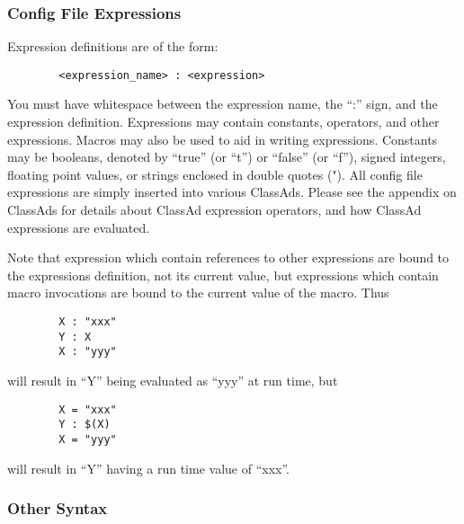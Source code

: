 \subsubsection{Config File Expressions}
\label{sec:Config-File-Expressions}

Expression definitions are of the form:

\begin{verbatim}
        <expression_name> : <expression>
\end{verbatim}

\Note You must have whitespace between the expression name,
the ``:'' sign, and the expression definition.  Expressions may
contain constants, operators, and other expressions.  Macros may also
be used to aid in writing expressions.  Constants may be booleans,
denoted by ``true'' (or ``t'') or ``false'' (or ``f''), signed
integers, floating point values, or strings enclosed in double quotes
(").  All config file expressions are simply inserted into various
ClassAds.  Please see the appendix on ClassAds for details about
ClassAd expression operators, and how ClassAd expressions are
evaluated.

Note that expression which contain references to other expressions are
bound to the expressions definition, not its current value, but
expressions which contain macro invocations are bound to the current
value of the macro.  Thus

\begin{verbatim}
        X : "xxx"
        Y : X
        X : "yyy"
\end{verbatim}

will result in ``Y'' being evaluated as ``yyy'' at run time, but

\begin{verbatim}
        X = "xxx"
        Y : $(X)
        X = "yyy" 
\end{verbatim}

will result in ``Y'' having a run time value of ``xxx''.

\subsubsection{Other Syntax}
\label{sec:Other-Syntax}

